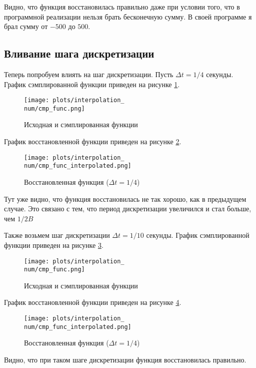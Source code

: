 Видно, что функция восстановилась правильно даже при условии того, что в программной реализации нельзя 
брать бесконечную сумму. В своей программе я брал сумму от $-500$ до $500$.

\subsection{Вливание шага дискретизации}
\def\num{2}
Теперь попробуем влиять на шаг дискретизации. Пусть $\Delta t = 1/4$ секунды. График сэмплированной функции приведен на рисунке \ref{fig:source_sampled_func\num}.
\begin{figure}[ht!]
    \centering
    \texttt{[image: plots/interpolation\_\\num/cmp\_func.png]}
    \caption{Исходная и сэмплированная функции}
    \label{fig:source_sampled_func\num}
\end{figure}

График восстановленной функции приведен на рисунке \ref{fig:interpolated_func\num}.
\begin{figure}[ht!]
    \centering
    \texttt{[image: plots/interpolation\_\\num/cmp\_func\_interpolated.png]}
    \caption{Восстановленная функция ($\Delta t = 1/4$)}
    \label{fig:interpolated_func\num}
\end{figure}

Тут уже видно, что функция восстановилась не так хорошо, как в предыдущем случае. Это связано с тем, 
что период дискретизации увеличился и стал больше, чем $1/2B$

\def\num{3}
Также возьмем шаг дискретизации $\Delta t = 1/10$ секунды. График сэмплированной функции приведен на рисунке \ref{fig:source_sampled_func\num}.
\begin{figure}[ht!]
    \centering
    \texttt{[image: plots/interpolation\_\\num/cmp\_func.png]}
    \caption{Исходная и сэмплированная функции}
    \label{fig:source_sampled_func\num}
\end{figure}

График восстановленной функции приведен на рисунке \ref{fig:interpolated_func\num}.
\begin{figure}[ht!]
    \centering
    \texttt{[image: plots/interpolation\_\\num/cmp\_func\_interpolated.png]}
    \caption{Восстановленная функция ($\Delta t = 1/4$)}
    \label{fig:interpolated_func\num}
\end{figure}

Видно, что при таком шаге дискретизации функция восстановилась правильно.

